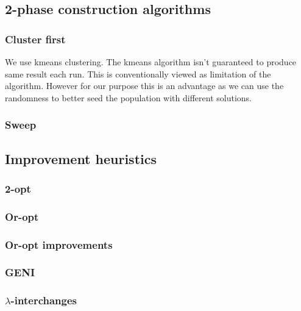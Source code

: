 

\subsection{2-phase construction algorithms}
\label{2phasealgorithms}

\subsubsection{Cluster first}

We use kmeans clustering. The kmeans algorithm isn't guaranteed to produce same result each run. This is conventionally viewed as limitation of the algorithm. However for our purpose this is an advantage as we can use the randomness to better seed the population with different solutions.  

\subsubsection{Sweep}


\subsection{Improvement heuristics}

\subsubsection{2-opt}

\subsubsection{Or-opt}

\subsubsection{Or-opt improvements}

\subsubsection{GENI}

\subsubsection{$\lambda$-interchanges}

